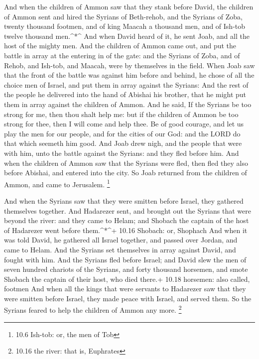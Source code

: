  And when the children of Ammon saw that they stank before
David, the children of Ammon sent and hired the Syrians of Beth-rehob,
and the Syrians of Zoba, twenty thousand footmen, and of king Maacah a
thousand men, and of Ish-tob twelve thousand men.\^{}*\^{} 
And when David heard of it, he sent Joab, and all the host of the mighty
men.  And the children of Ammon came out, and put the battle
in array at the entering in of the gate: and the Syrians of Zoba, and of
Rehob, and Ish-tob, and Maacah, were by themselves in the field.
 When Joab saw that the front of the battle was against him
before and behind, he chose of all the choice men of Israel, and put
them in array against the Syrians:  And the rest of the
people he delivered into the hand of Abishai his brother, that he might
put them in array against the children of Ammon.  And he
said, If the Syrians be too strong for me, then thou shalt help me: but
if the children of Ammon be too strong for thee, then I will come and
help thee.  Be of good courage, and let us play the men for
our people, and for the cities of our God: and the LORD do that which
seemeth him good.  And Joab drew nigh, and the people that
were with him, unto the battle against the Syrians: and they fled before
him.  And when the children of Ammon saw that the Syrians
were fled, then fled they also before Abishai, and entered into the
city. So Joab returned from the children of Ammon, and came to
Jerusalem. \footnote{10.6 Ish-tob: or, the men of Tob}

 And when the Syrians saw that they were smitten before
Israel, they gathered themselves together.  And Hadarezer
sent, and brought out the Syrians that were beyond the river: and they
came to Helam; and Shobach the captain of the host of Hadarezer went
before them.\^{}*\^{}+ 10.16 Shobach: or, Shophach  And
when it was told David, he gathered all Israel together, and passed over
Jordan, and came to Helam. And the Syrians set themselves in array
against David, and fought with him.  And the Syrians fled
before Israel; and David slew the men of seven hundred chariots of the
Syrians, and forty thousand horsemen, and smote Shobach the captain of
their host, who died there.+ 10.18 horsemen: also called, footmen
 And when all the kings that were servants to Hadarezer saw
that they were smitten before Israel, they made peace with Israel, and
served them. So the Syrians feared to help the children of Ammon any
more. \footnote{10.16 the river: that is, Euphrates}

